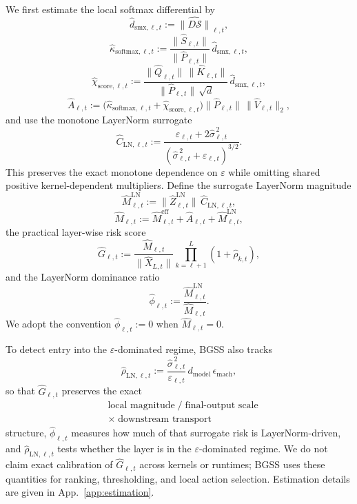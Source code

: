 \documentclass[twoside]{article}
\theoremstyle{definition}
\theoremstyle{remark}
\begin{document}
We first estimate the local softmax differential by
\[
\widehat{d}_{\mathrm{smx},\ell,t}
:=
\widehat{\|D\mathcal{S}\|}_{\ell,t},
\]
\[
\widehat{\kappa}_{\mathrm{softmax},\ell,t}
:=
\frac{\|\widehat{S}_{\ell,t}\|}{\|\widehat{P}_{\ell,t}\|}\,
\widehat{d}_{\mathrm{smx},\ell,t},
\]
\[
\widehat{\chi}_{\mathrm{score},\ell,t}
:=
\frac{\|\widehat{Q}_{\ell,t}\|\,\|\widehat{K}_{\ell,t}\|}
{\|\widehat{P}_{\ell,t}\|\,\sqrt d}\,
\widehat{d}_{\mathrm{smx},\ell,t},
\]
\[
\widehat{A}_{\ell,t}
:=
\bigl(
\widehat{\kappa}_{\mathrm{softmax},\ell,t}
+
\widehat{\chi}_{\mathrm{score},\ell,t}
\bigr)
\|\widehat{P}_{\ell,t}\|\,\|\widehat{V}_{\ell,t}\|_2,
\]
and use the monotone LayerNorm surrogate
\[
\widehat{C}_{\mathrm{LN},\ell,t}
:=
\frac{\varepsilon_{\ell,t}+2\widehat{\sigma}_{\ell,t}^{\,2}}
{(\widehat{\sigma}_{\ell,t}^{\,2}+\varepsilon_{\ell,t})^{3/2}}.
\]
This preserves the exact monotone dependence on $\varepsilon$ while omitting shared
positive kernel-dependent multipliers. Define the surrogate LayerNorm magnitude
\[
\widehat{M}^{\mathrm{LN}}_{\ell,t}
:=
\|\widehat{Z}^{\mathrm{LN}}_{\ell,t}\|\,\widehat{C}_{\mathrm{LN},\ell,t},
\]
\[
\widehat{M}_{\ell,t}
:=
\widehat{M}^{\mathrm{eff}}_{\ell,t}
+
\widehat{A}_{\ell,t}
+
\widehat{M}^{\mathrm{LN}}_{\ell,t},
\]
the practical layer-wise risk score
\begin{equation}
\label{eq:alg-risk}
\widehat{G}_{\ell,t}
:=
\frac{\widehat{M}_{\ell,t}}{\|\widehat{X}_{L,t}\|}
\prod_{k=\ell+1}^{L}(1+\widehat{\rho}_{k,t}),
\end{equation}
and the LayerNorm dominance ratio
\begin{equation}
\label{eq:alg-phi}
\widehat{\phi}_{\ell,t}
:=
\frac{\widehat{M}^{\mathrm{LN}}_{\ell,t}}{\widehat{M}_{\ell,t}}.
\end{equation}
We adopt the convention $\widehat{\phi}_{\ell,t}:=0$ when
$\widehat{M}_{\ell,t}=0$.

To detect entry into the $\varepsilon$-dominated regime, BGSS also tracks
\begin{equation}
\label{eq:alg-rho-ln}
\widehat{\rho}_{\mathrm{LN},\ell,t}
:=
\frac{\widehat{\sigma}_{\ell,t}^{\,2}}{\varepsilon_{\ell,t}}\,
d_{\mathrm{model}}\,
\epsilon_{\mathrm{mach}},
\end{equation}
so that $\widehat{G}_{\ell,t}$ preserves the exact
\[
\begin{aligned}
&\text{local magnitude}\;/\;\text{final-output scale}
\\
&\times\;\text{downstream transport}
\end{aligned}
\]
structure, $\widehat{\phi}_{\ell,t}$ measures how much of that surrogate risk is
LayerNorm-driven, and $\widehat{\rho}_{\mathrm{LN},\ell,t}$ tests whether the layer is in the
$\varepsilon$-dominated regime. We do not claim exact calibration of
$\widehat{G}_{\ell,t}$ across kernels or runtimes; BGSS uses these quantities
for ranking, thresholding, and local action selection. Estimation details are
given in App.~\ref{app:estimation}.
\end{document}
